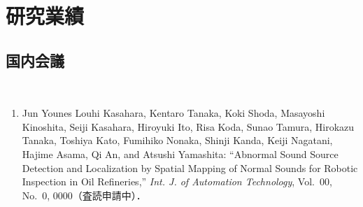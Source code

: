 \documentclass[../main]{subfiles}
\begin{document}
\chapter*{研究業績}
\label{achive}

\lhead[研究業績]{}
\thispagestyle{empty}

\newpage


\section*{国内会議}
\leavevmode \\


\begin{enumerate}
  \item Jun Younes Louhi Kasahara, Kentaro Tanaka, Koki Shoda, Masayoshi Kinoshita, Seiji Kasahara, Hiroyuki Ito, Risa Koda, Sunao Tamura, Hirokazu Tanaka, Toshiya Kato, Fumihiko Nonaka, Shinji Kanda, Keiji Nagatani, Hajime Asama, Qi An, and Atsushi Yamashita: ``Abnormal Sound Source Detection and Localization by Spatial Mapping of Normal Sounds for Robotic Inspection in Oil Refineries,'' \textit{Int. J. of Automation Technology}, Vol.~00, No.~0, 0000（査読申請中）．\\
\end{enumerate}



\end{document}
